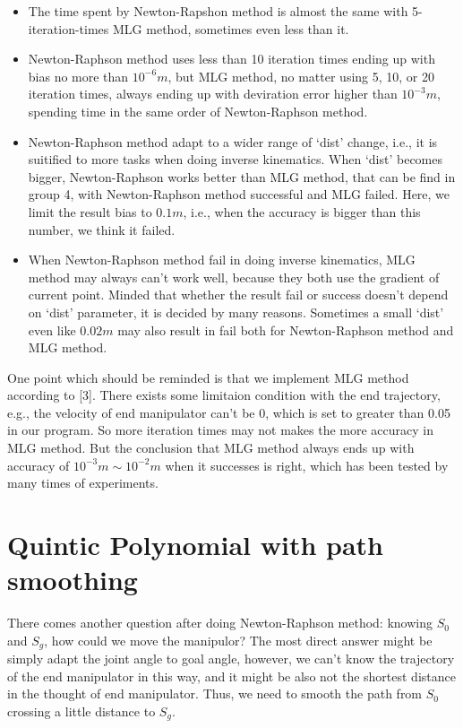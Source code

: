 \documentclass[letterpaper, 10 pt, conference]{ieeeconf}  %
\begin{document}
\begin{itemize}

\item  The time spent by Newton-Rapshon method is almost the same with 5-iteration-times MLG method, sometimes even less than it.
\item  Newton-Raphson method uses less than 10 iteration times ending up with bias no more than $10^{-6}m$, but MLG method, no matter using 5, 10, or 20 iteration times, always ending up with deviration error higher than $10^{-3}m$, spending time in the same order of Newton-Raphson method.  
\item Newton-Raphson method adapt to a wider range of `dist' change, i.e., it is suitified to more tasks when doing inverse kinematics. When `dist' becomes bigger, Newton-Raphson works better than MLG method, that can be find in group 4, with Newton-Raphson method successful and MLG failed. Here, we limit the result bias to $0.1m$, i.e., when the accuracy is bigger than this number, we think it failed. 
\item When Newton-Raphson method fail in doing inverse kinematics, MLG method may always can't work well, because they both use the gradient of current point. Minded that whether the result fail or success doesn't depend on `dist' parameter, it is decided by many reasons. Sometimes a small `dist' even like $0.02m$ may also result in fail both for Newton-Raphson method and MLG method.

\end{itemize}

One point which should be reminded is that we implement MLG method according to [3]. There exists some limitaion condition with the end trajectory, e.g., the velocity of end manipulator can't be 0, which is set to greater than 0.05 in our program. So more iteration times may not makes the more accuracy in MLG method. But the conclusion that MLG method always ends up with accuracy of $10^{-3}m\sim10^{-2}m$ when it successes is right, which has been tested by many times of experiments. 

\section{Quintic Polynomial with path smoothing}

There comes another question after doing Newton-Raphson method: knowing $S_{0}$ and $S_{g}$, how could we move the manipulor? The most direct answer might be simply adapt the joint angle to goal angle, however, we can't know the trajectory of the end manipulator in this way, and it might be also not the shortest distance in the thought of end manipulator. Thus, we need to smooth the path from $S_{0}$ crossing a little distance to $S_{g}$. 
\end{document}
